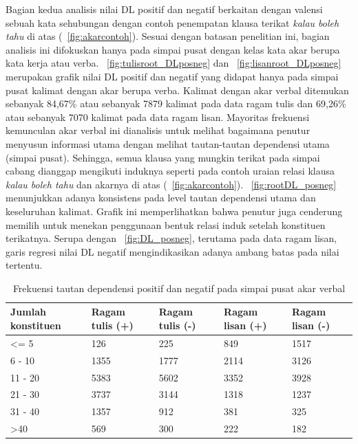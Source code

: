 Bagian kedua analisis nilai DL positif dan negatif berkaitan dengan valensi sebuah kata sehubungan dengan contoh penempatan klausa terikat \textit{kalau boleh tahu} di atas (\pic~\ref{fig:akarcontoh}). Sesuai dengan batasan penelitian ini, bagian analisis ini difokuskan hanya pada simpai pusat dengan kelas kata akar berupa kata kerja atau verba. \pic~\ref{fig:tulisroot_DLposneg} dan \pic~\ref{fig:lisanroot_DLposneg} merupakan grafik nilai DL positif dan negatif yang didapat hanya pada simpai pusat kalimat dengan akar berupa verba. Kalimat dengan akar verbal ditemukan sebanyak 84,67\% atau sebanyak 7879 kalimat pada data ragam tulis dan 69,26\% atau sebanyak 7070 kalimat pada data ragam lisan. Mayoritas frekuensi kemunculan akar verbal ini dianalisis untuk melihat bagaimana penutur menyusun informasi utama dengan melihat tautan-tautan dependensi utama (simpai pusat). Sehingga, semua klausa yang mungkin terikat pada simpai cabang dianggap mengikuti induknya seperti pada contoh uraian relasi klausa \textit{kalau boleh tahu} dan akarnya di atas (\pic~\ref{fig:akarcontoh}). \pic~\ref{fig:rootDL_posneg} menunjukkan adanya konsistens pada level tautan dependensi utama dan keseluruhan kalimat. Grafik ini memperlihatkan bahwa penutur juga cenderung memilih untuk menekan penggunaan bentuk relasi induk setelah konstituen terikatnya. Serupa dengan \pic~\ref{fig:DL_posneg}, terutama pada data ragam lisan, garis regresi nilai DL negatif mengindikasikan adanya ambang batas pada nilai tertentu.

\begin{table}
\begin{center}
\begin{small}
\caption{Frekuensi tautan dependensi positif dan negatif pada simpai pusat akar verbal}  \label{tab:tautanpusatposneg}
\begin{tabular}{ | p{2cm} | p{2cm} | p{2cm} | p{2cm} | p{2cm} |}
    \hline
Jumlah konstituen & Ragam tulis (+) & Ragam tulis (-) & Ragam lisan (+) & Ragam lisan (-) \\ \hline
\textless= 5 & 126 & 225 & 849 & 1517 \\ \hline
6 - 10 & 1355 & 1777 & 2114 & 3126 \\ \hline
11 - 20 & 5383 & 5602 & 3352 & 3928 \\ \hline
21 - 30 & 3737 & 3144 & 1318 & 1237 \\ \hline
31 - 40 & 1357 & 912 & 381 & 325 \\ \hline
\textgreater 40 & 569 & 300 & 222 & 182 \\ \hline
   \end{tabular}
   \end{small}
\end{center}
\end{table}

